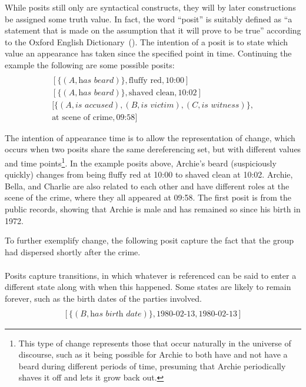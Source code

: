 \documentclass[sfsidenotes,nobib,twoside,symmetric]{tufte-handout}
\renewcommand{\parencite}[2][0pt]{(\citeauthor{#2})\sidenote[][#1]{\fullcite{#2}}}
\begin{document}
While posits still only are syntactical constructs, they will by later constructions be assigned some truth value. In fact, the word \enquote{posit} is suitably defined as \enquote{a statement that is made on the assumption that it will prove to be true} according to the Oxford English Dictionary~\parencite{Oxford}. The intention of a posit is to state which value an appearance has taken since the specified point in time. Continuing the example the following are some possible posits:
\begin{align*}
[\{(A, \textit{has gender})\}, \textrm{male}, 1972]  \\
[\{(A, \textit{has beard})\}, \textrm{fluffy red}, \textrm{10:00}]  \\
[\{(A, \textit{has beard})\}, \textrm{shaved clean}, \textrm{10:02}]  \\
[\{(A, \textit{is accused}),(B, \textit{is victim}),(C, \textit{is witness})\}, \\ 
\textrm{at scene of crime}, \textrm{09:58}] 
\end{align*}

The intention of appearance time is to allow the representation of change, which occurs when two posits share the same dereferencing set, but with different values and time points\footnote{This type of change represents those that occur naturally in the universe of discourse, such as it being possible for Archie to both have and not have a beard during different periods of time, presuming that Archie periodically shaves it off and lets it grow back out.}. In the example posits above, Archie's beard (suspiciously quickly) changes from being fluffy red at 10:00 to shaved clean at 10:02. Archie, Bella, and Charlie are also related to each other and have different roles at the scene of the crime, where they all appeared at 09:58. The first posit is from the public records, showing that Archie is male and has remained so since his birth in 1972.

To further exemplify change, the following posit capture the fact that the group had dispersed shortly after the crime. 
\begin{align*}
[\{(A, \textit{is accused}),(B, \textit{is victim}),(C, \textit{is witness})\}, \\ 
\textrm{dispersed}, \textrm{10:02}] 
\end{align*}

Posits capture transitions, in which whatever is referenced can be said to enter a different state along with when this happened. Some states are likely to remain forever, such as the birth dates of the parties involved. 
\begin{align*}
[\{(A, \textit{has birth date})\}, \textrm{1972-08-20}, \textrm{1972-08-20}]  \\
[\{(B, \textit{has birth date})\}, \textrm{1980-02-13}, \textrm{1980-02-13}]  
\end{align*}
\end{document}
